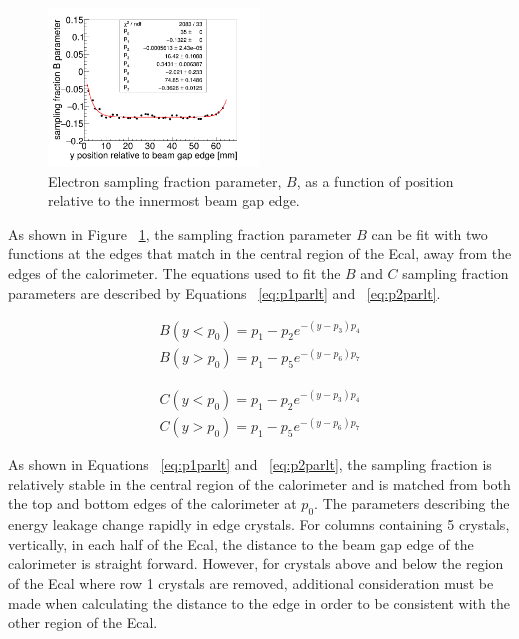 \documentclass[twoside]{article}
\begin{document}
\begin{multicols}{2}
\begin{figure}[H]
  \centering
      \includegraphics[width=0.5\textwidth]{pics/par0_em.png}
  \caption{Electron sampling fraction parameter, $B$, as a function of position relative to the innermost beam gap edge.}
  \label{p1_em}
\end{figure} 

As shown in Figure ~\ref{p1_em}, the sampling fraction parameter $B$ can be fit with two functions at the edges that match in the central region of the Ecal, away from the edges of the calorimeter. The equations used to fit the $B$ and $C$ sampling fraction parameters are described by Equations ~\eqref{eq:p1parlt} and ~\eqref{eq:p2parlt}.

\begin{equation}
\begin{split}
\label{eq:p1parlt}
B(y<p_0) = p_1-p_2 e^{-(y-p_3)p_4}\\
B(y>p_0) = p_1-p_5 e^{-(y-p_6)p_7}
\end{split}
\end{equation}

\begin{equation}
\begin{split}
\label{eq:p2parlt}
C(y<p_0) = p_1-p_2 e^{-(y-p_3)p_4}\\
C(y>p_0) = p_1-p_5 e^{-(y-p_6)p_7}
\end{split}
\end{equation}

As shown in Equations ~\eqref{eq:p1parlt} and ~\eqref{eq:p2parlt}, the sampling fraction is relatively stable in the central region of the calorimeter and is matched from both the top and bottom edges of the calorimeter at $p_0$. The parameters describing the energy leakage change rapidly in edge crystals. For columns containing 5 crystals, vertically, in each half of the Ecal, the distance to the beam gap edge of the calorimeter is straight forward. However, for crystals above and below the region of the Ecal where row 1 crystals are removed, additional consideration must be made when calculating the distance to the edge in order to be consistent with the other region of the Ecal.


\end{multicols}
\end{document}
